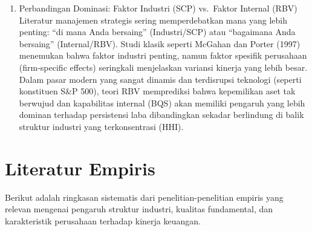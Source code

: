 \documentclass[12pt,a4paper]{report}
\providecommand{\tightlist}{%
  \setlength{\itemsep}{0pt}\setlength{\parskip}{0pt}%
}
\begin{document}
\begin{enumerate}
\def\labelenumi{\arabic{enumi}.}
\setcounter{enumi}{2}
\tightlist
\item
  Perbandingan Dominasi: Faktor Industri (SCP) vs.~Faktor Internal (RBV)
  Literatur manajemen strategis sering memperdebatkan mana yang lebih
  penting: ``di mana Anda bersaing'' (Industri/SCP) atau ``bagaimana
  Anda bersaing'' (Internal/RBV). Studi klasik seperti McGahan dan
  Porter (1997) menemukan bahwa faktor industri penting, namun faktor
  spesifik perusahaan (firm-specific effects) seringkali menjelaskan
  variansi kinerja yang lebih besar. Dalam pasar modern yang sangat
  dinamis dan terdisrupsi teknologi (seperti konstituen S\&P 500), teori
  RBV memprediksi bahwa kepemilikan aset tak berwujud dan kapabilitas
  internal (BQS) akan memiliki pengaruh yang lebih dominan terhadap
  persistensi laba dibandingkan sekadar berlindung di balik struktur
  industri yang terkonsentrasi (HHI).
\end{enumerate}

\hypertarget{literatur-empiris}{%
\section{Literatur Empiris}\label{literatur-empiris}}

Berikut adalah ringkasan sistematis dari penelitian-penelitian empiris
yang relevan mengenai pengaruh struktur industri, kualitas fundamental,
dan karakteristik perusahaan terhadap kinerja keuangan.
\end{document}
